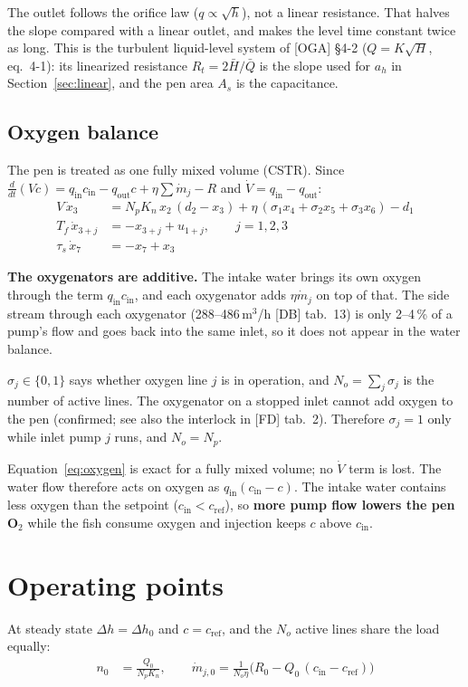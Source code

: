 \documentclass[11pt]{article}
\begin{document}
The outlet follows the orifice law ($q\propto\sqrt{h}$), not a linear resistance. That halves
the slope compared with a linear outlet, and makes the level time constant twice as long. This is
the turbulent liquid-level system of [OGA] §4-2 ($Q=K\sqrt H$, eq.~4-1): its linearized
resistance $R_t = 2\bar H/\bar Q$ is the slope used for $a_h$ in Section~\ref{sec:linear}, and
the pen area $A_s$ is the capacitance.

\subsection{Oxygen balance}
The pen is treated as one fully mixed volume (CSTR). Since
$\frac{d}{dt}(Vc) = q_\text{in}c_\text{in} - q_\text{out}c + \eta\sum\dot m_j - R$ and
$\dot V = q_\text{in}-q_\text{out}$:
\begin{align}
V\,\dot x_3 &= N_pK_n\,x_2\,(d_2 - x_3) + \eta\,(\sigma_1x_4+\sigma_2x_5+\sigma_3x_6) - d_1 \label{eq:oxygen}\\
T_f\,\dot x_{3+j} &= -x_{3+j} + u_{1+j}, \qquad j=1,2,3 \label{eq:fic}\\
\tau_s\,\dot x_7 &= -x_7 + x_3 \label{eq:sensor}
\end{align}

\textbf{The oxygenators are additive.} The intake water brings its own oxygen through the term
$q_\text{in}c_\text{in}$, and each oxygenator adds $\eta\dot m_j$ on top of that. The side
stream through each oxygenator (288--486\,m$^3$/h [DB] tab.~13) is only 2--4\,\% of a pump's
flow and goes back into the same inlet, so it does not appear in the water balance.

$\sigma_j\in\{0,1\}$ says whether oxygen line $j$ is in operation, and
$N_o=\sum_j\sigma_j$ is the number of active lines. The oxygenator on a stopped inlet cannot add
oxygen to the pen (confirmed; see also the interlock in [FD] tab.~2). Therefore $\sigma_j = 1$
only while inlet pump $j$ runs, and \textbf{$N_o = N_p$}.

Equation~\eqref{eq:oxygen} is exact for a fully mixed volume; no $\dot V$ term is lost. The
water flow therefore acts on oxygen as $q_\text{in}(c_\text{in}-c)$. The intake water contains
less oxygen than the setpoint ($c_\text{in}<c_\text{ref}$), so \textbf{more pump flow lowers the
pen O$_2$} while the fish consume oxygen and injection keeps $c$ above $c_\text{in}$.

\section{Operating points}\label{sec:op}
At steady state $\Delta h=\Delta h_0$ and $c=c_\text{ref}$, and the $N_o$ active lines share the
load equally:
\begin{align}
n_0 &= \frac{Q_0}{N_pK_n}, \qquad
\dot m_{j,0} = \frac{1}{N_o\eta}\Big(R_0 - Q_0\,(c_\text{in}-c_\text{ref})\Big)
\end{align}
\end{document}
